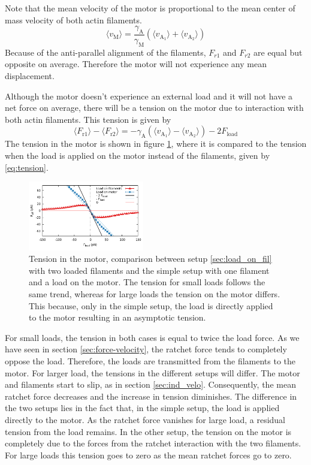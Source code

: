 \documentclass[aps,pre,twocolumn,showpacs,showkeys,superscriptaddress,floatfix]{revtex4-1}
\begin{document}
Note that the mean velocity of the motor is proportional to the mean center of mass velocity of both actin filaments. 
\begin{equation}
\langle v_\text{M} \rangle = \frac{\gamma_\text{A}}{\gamma_\text{M}} \left(\langle v_{\text{A}_1} \rangle + \langle v_{\text{A}_2} \rangle \right) 
\label{eq:tug_F_motor}
\end{equation}
Because of the anti-parallel alignment of the filaments, $F_{r1}$ and $F_{r2}$ are equal but opposite on average. 
Therefore the motor will not experience any mean displacement.  

Although the motor doesn't experience an external load and it will not have a net force on average, there will be a tension on the motor due to interaction with both actin filaments. This tension is given by
\begin{equation*}
\langle F_\text{r1}\rangle - \langle F_\text{r2}\rangle = -\gamma_\text{A}\left(\langle v_{\text{A}_1}\rangle - \langle v_{\text{A}_2}\rangle \right) - 2F_\text{load}
\end{equation*}
The tension in the motor is shown in figure \ref{fig:tug_F}, where it is compared to the tension when the load is applied on the motor instead of the filaments, given by \eqref{eq:tension}. 

\begin{figure}[t]
\centering
\includegraphics[width=0.45\textwidth,height=!]{tug_F}
\caption{
\label{fig:tug_F}
Tension in the motor, comparison between setup \ref{sec:load_on_fil} with two loaded filaments and the simple setup with one filament and a load on the motor. 
The tension for small loads follows the same trend, whereas for large loads the tension on the motor differs. 
This because, only in the simple setup, the load is directly applied to the motor resulting in an asymptotic tension. %
}
\end{figure}

For small loads, the tension in both cases is equal to twice the load force. As we have seen in section \ref{sec:force-velocity}, the ratchet force tends to completely oppose the load. 
Therefore, the loads are transmitted from the filaments to the motor.
For larger load, the tensions in the different setups will differ. The motor and filaments start to slip, as in section \ref{sec:ind_velo}. 
Consequently, the mean ratchet force decreases and the increase in tension diminishes.
The difference in the two setups lies in the fact that, in the simple setup, the load is applied directly to the motor. As the ratchet force vanishes for large load, a residual tension from the load remains.
In the other setup, the tension on the motor is completely due to the forces from the ratchet interaction with the two filaments. For large loads this tension goes to zero as the mean ratchet forces go to zero. 
\end{document}
